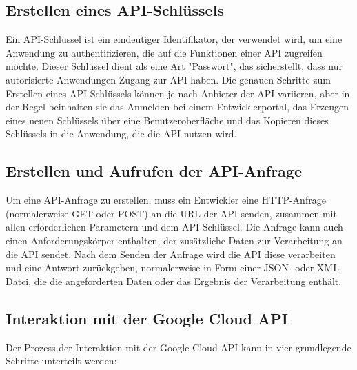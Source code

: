 \documentclass[12pt,a4paper]{article}
\begin{document}
\subsection{Erstellen eines API-Schlüssels}
Ein API-Schlüssel ist ein eindeutiger Identifikator, der verwendet wird, um eine Anwendung zu authentifizieren, die auf die Funktionen einer API zugreifen möchte. Dieser Schlüssel dient als eine Art "Passwort", das sicherstellt, dass nur autorisierte Anwendungen Zugang zur API haben. Die genauen Schritte zum Erstellen eines API-Schlüssels können je nach Anbieter der API variieren, aber in der Regel beinhalten sie das Anmelden bei einem Entwicklerportal, das Erzeugen eines neuen Schlüssels über eine Benutzeroberfläche und das Kopieren dieses Schlüssels in die Anwendung, die die API nutzen wird.

\subsection{Erstellen und Aufrufen der API-Anfrage}
Um eine API-Anfrage zu erstellen, muss ein Entwickler eine HTTP-Anfrage (normalerweise GET oder POST) an die URL der API senden, zusammen mit allen erforderlichen Parametern und dem API-Schlüssel. Die Anfrage kann auch einen Anforderungskörper enthalten, der zusätzliche Daten zur Verarbeitung an die API sendet. Nach dem Senden der Anfrage wird die API diese verarbeiten und eine Antwort zurückgeben, normalerweise in Form einer JSON- oder XML-Datei, die die angeforderten Daten oder das Ergebnis der Verarbeitung enthält.

\subsection{Interaktion mit der Google Cloud API}

Der Prozess der Interaktion mit der Google Cloud API kann in vier grundlegende Schritte unterteilt werden:
\end{document}
